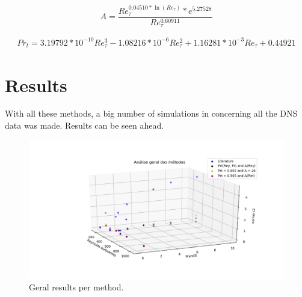\documentclass[10pt]{article} %
\begin{document}
\begin{equation}
A = \frac{Re_\tau ^{0.04510 * \ln(Re_\tau)} *e ^ {5.27528} }{Re_\tau ^{0.60911}}
\end{equation}

\begin{equation}
\begin{split}
Pr_t = 3.19792 * 10^{-10} Re_\tau^3 - 1.08216 * 10^{-6} Re_\tau^2 + 1.16281 *10 ^{-3} Re_\tau + 0.44921 
\end{split}
\end{equation}






 


 

\section{Results}
With all these methods, a big number of simulations in concerning all the DNS data was made.
Results can be seen ahead.\\
\begin{figure}[!h]
	\centering
	\includegraphics[angle=0, scale=0.42]{finais}
	\caption{Geral results per method.}
\end{figure}
\end{document}
